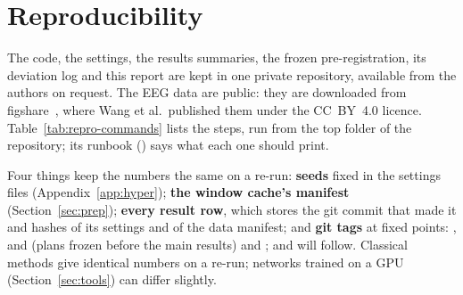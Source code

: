 \renewcommand{\topfraction}{0.9}
\renewcommand{\bottomfraction}{0.8}
\renewcommand{\textfraction}{0.07}
\renewcommand{\floatpagefraction}{0.85}

\chapter{Reproducibility}\label{app:repro}

The code, the settings, the results summaries, the frozen pre-registration, its deviation log
and this report are kept in one private repository, available from the authors on request. The
EEG data are public: they are downloaded from figshare~\cite{wang2026figshare}, where Wang et
al.\ published them under the CC~BY~4.0 licence. Table~\ref{tab:repro-commands} lists the
steps, run from the top folder of the repository; its runbook () says
what each one should print.

Four things keep the numbers the same on a re-run: \textbf{seeds} fixed in the settings files
(Appendix~\ref{app:hyper}); \textbf{the window cache's manifest} (Section~\ref{sec:prep});
\textbf{every result row}, which stores the git commit
that made it and hashes of its settings and of the data manifest; and \textbf{git tags} at fixed
points: ,  and  (plans frozen before the main
results) and ;  and  will follow. Classical methods give identical numbers on a re-run; networks trained on a GPU
(Section~\ref{sec:tools}) can differ slightly.

